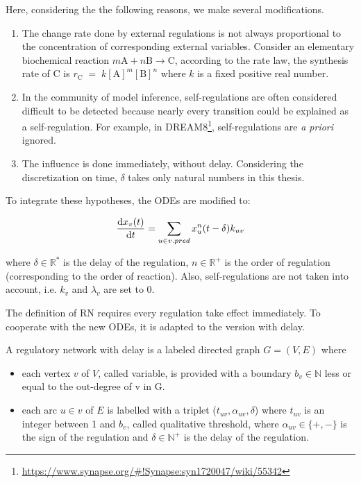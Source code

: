 Here, considering the the following reasons, we make several modifications.
\begin{enumerate}
    \item The change rate done by external regulations is not always proportional to the concentration of corresponding external variables. 
    Consider an elementary biochemical reaction $m\mathrm  {A}+n\mathrm  {B}\rightarrow \mathrm  {C}$, according to the rate law, the synthesis rate of C is $r_{\mathrm  {C}}\;=\;k[{\mathrm  {A}}]^{m}[{\mathrm  {B}}]^{n}$ where $k$ is a fixed positive real number.
    \item In the community of model inference, self-regulations are often considered difficult to be detected because nearly every transition could be explained as a self-regulation.
    For example, in DREAM8\footnote{\url{https://www.synapse.org/\#!Synapse:syn1720047/wiki/55342}}, self-regulations are \textit{a priori} ignored.  
    \item The influence is done immediately, without delay.
    Considering the discretization on time, $\delta$ takes only natural numbers in this thesis.
\end{enumerate}

To integrate these hypotheses, the ODEs are modified to:

\begin{equation}\label{eq:ode}
    \dfrac{{\rm d}x_v(t)}{{\rm d}t}=\sum_{u\in v.pred}{x_u^{n}(t-\delta)k_{uv}}
\end{equation}


where $\delta\in \mathbb{R}^{*}$ is the delay of the regulation, $n\in \mathbb{R}^{+}$ is the order of regulation (corresponding to the order of reaction).
Also, self-regulations are not taken into account, i.e. $k_v$ and $\lambda_v$ are set to 0.

The definition of RN requires every regulation take effect immediately.
To cooperate with the new ODEs, it is adapted to the version with delay.

\begin{definition}
A regulatory network with delay is a labeled directed graph $G=(V,E)$ where 
\begin{itemize}
    \item each vertex $v$ of $V$, called variable, is provided with a boundary $b_v\in \mathbb{N}$ less or equal to the out-degree of v in G.
    \item each arc $u\in v$ of $E$ is labelled with a triplet ($t_{uv}, \alpha_{uv}, \delta$) where $t_{uv}$ is an integer between 1 and $b_v$, called qualitative threshold, where $\alpha_{uv}\in \{+,-\}$ is the sign of the regulation and $\delta\in \mathbb{N^+}$ is the delay of the regulation.
\end{itemize}
\end{definition}


